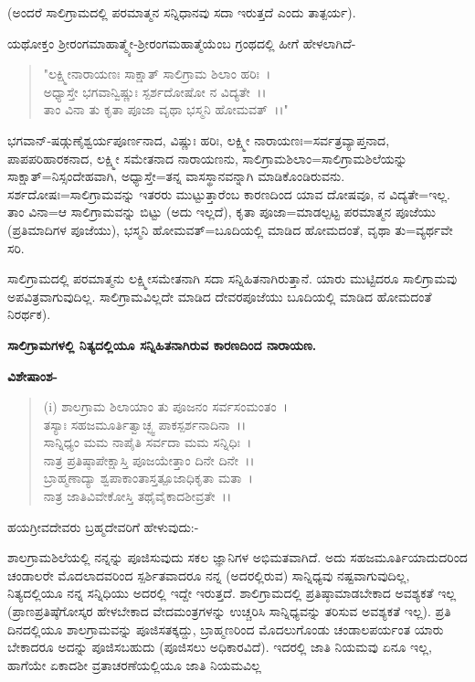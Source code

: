 (ಅಂದರೆ ಸಾಲಿಗ್ರಾಮದಲ್ಲಿ ಪರಮಾತ್ಮನ ಸನ್ನಿಧಾನವು ಸದಾ ಇರುತ್ತದೆ ಎಂದು ತಾತ್ಪರ್ಯ).

ಯಥೋಕ್ತಂ ಶ‍್ರೀರಂಗಮಾಹಾತ್ಮ್ಯೇ-ಶ‍್ರೀರಂಗಮಹಾತ್ಮೆಯೆಂಬ ಗ್ರಂಥದಲ್ಲಿ ಹೀಗೆ ಹೇಳಲಾಗಿದೆ-

\begin{verse}
"ಲಕ್ಷ್ಮೀನಾರಾಯಣಃ ಸಾಕ್ಷಾತ್ ಸಾಲಿಗ್ರಾಮ ಶಿಲಾಂ ಹರಿಃ~।\\ ಅಧ್ಯಾಸ್ತೇ ಭಗವಾನ್ವಿಷ್ಣುಃ ಸ್ಪರ್ಶದೋಷೋ ನ ವಿದ್ಯತೇ~।।\\ ತಾಂ ವಿನಾ ತು ಕೃತಾ ಪೂಜಾ ವೃಥಾ ಭಸ್ಮನಿ ಹೋಮವತ್~।।"
\end{verse}


ಭಗವಾನ್-ಷಡ್ಗುಣೈಶ್ವರ್ಯಪೂರ್ಣನಾದ, ವಿಷ್ಣುಃ ಹರಿಃ, ಲಕ್ಷ್ಮೀ ನಾರಾಯಣಃ=ಸರ್ವತ್ರವ್ಯಾಪ್ತನಾದ, ಪಾಪಪರಿಹಾರಕನಾದ, ಲಕ್ಷ್ಮೀ ಸಮೇತನಾದ ನಾರಾಯಣನು, ಸಾಲಿಗ್ರಾಮಶಿಲಾಂ=ಸಾಲಿಗ್ರಾಮಶಿಲೆಯನ್ನು ಸಾಕ್ಷಾತ್=ನಿಸ್ಸಂದೇಹವಾಗಿ, ಅಧ್ಯಾಸ್ತೇ=ತನ್ನ ವಾಸಸ್ಥಾನವನ್ನಾಗಿ ಮಾಡಿಕೊಂಡಿರುವನು. ಸರ್ಶದೋಷಃ=ಸಾಲಿಗ್ರಾಮವನ್ನು ಇತರರು ಮುಟ್ಟುತ್ತಾರೆಂಬ ಕಾರಣದಿಂದ ಯಾವ ದೋಷವೂ, ನ ವಿದ್ಯತೇ=ಇಲ್ಲ. ತಾಂ ವಿನಾ=ಆ ಸಾಲಿಗ್ರಾಮವನ್ನು ಬಿಟ್ಟು (ಅದು ಇಲ್ಲದೆ), ಕೃತಾ ಪೂಜಾ=ಮಾಡಲ್ಪಟ್ಟ ಪರಮಾತ್ಮನ ಪೂಜೆಯು (ಪ್ರತಿಮಾದಿಗಳ ಪೂಜೆಯು), ಭಸ್ಮನಿ ಹೋಮವತ್=ಬೂದಿಯಲ್ಲಿ ಮಾಡಿದ ಹೋಮದಂತೆ, ವೃಥಾ ತು=ವ್ಯರ್ಥವೇ ಸರಿ.

ಸಾಲಿಗ್ರಾಮದಲ್ಲಿ ಪರಮಾತ್ಮನು ಲಕ್ಷ್ಮೀಸಮೇತನಾಗಿ ಸದಾ ಸನ್ನಿಹಿತನಾಗಿರುತ್ತಾನೆ. ಯಾರು ಮುಟ್ಟಿದರೂ ಸಾಲಿಗ್ರಾಮವು ಅಪವಿತ್ರವಾಗುವುದಿಲ್ಲ. ಸಾಲಿಗ್ರಾಮವಿಲ್ಲದೇ ಮಾಡಿದ ದೇವರಪೂಜೆಯು ಬೂದಿಯಲ್ಲಿ ಮಾಡಿದ ಹೋಮದಂತೆ ನಿರರ್ಥಕ).

\begin{center}
\textbf{ಸಾಲಿಗ್ರಾಮಗಳಲ್ಲಿ ನಿತ್ಯದಲ್ಲಿಯೂ ಸನ್ನಿಹಿತನಾಗಿರುವ ಕಾರಣದಿಂದ ನಾರಾಯಣ.}
\end{center}

\noindent
\textbf{ವಿಶೇಷಾಂಶ-}

\begin{verse}
(i) ಶಾಲಗ್ರಾಮ ಶಿಲಾಯಾಂ ತು ಪೂಜನಂ ಸರ್ವಸಂಮಂತಂ~।\\ ತಸ್ಯಾಃ ಸಹಜಮೂರ್ತಿತ್ವಾಚ್ಛ್ವ ಪಾಕಸ್ಪರ್ಶನಾದಿನಾ~।।\\ ಸಾನ್ನಿಧ್ಯಂ ಮಮ ನಾಪೈತಿ ಸರ್ವದಾ ಮಮ ಸನ್ನಿಧಿಃ~।\\ ನಾತ್ರ ಪ್ರತಿಷ್ಠಾಪೇಕ್ಷಾಸ್ತಿ ಪೂಜಯೇತ್ತಾಂ ದಿನೇ ದಿನೇ~।।\\ ಬ್ರಾಹ್ಮಣಾದ್ಯಾ ಶ್ವಪಾಕಾಂತಾಸ್ತತ್ಪೂಜಾಧಿಕೃತಾ ಮತಾ~।\\ ನಾತ್ರ ಜಾತಿವಿವೇಕೋಸ್ತಿ ತಥೈವೈಕಾದಶೀವ್ರತೇ~।।
\end{verse}


\noindent
ಹಯಗ್ರೀವದೇವರು ಬ್ರಹ್ಮದೇವರಿಗೆ ಹೇಳುವುದು:-

ಶಾಲಗ್ರಾಮಶಿಲೆಯಲ್ಲಿ ನನ್ನನ್ನು ಪೂಜಿಸುವುದು ಸಕಲ ಜ್ಞಾನಿಗಳ ಅಭಿಮತವಾಗಿದೆ. ಅದು ಸಹಜಮೂರ್ತಿಯಾದುದರಿಂದ ಚಂಡಾಲರೇ ಮೊದಲಾದವರಿಂದ ಸ್ಪರ್ಶಿತವಾದರೂ ನನ್ನ (ಅದರಲ್ಲಿರುವ) ಸಾನ್ನಿಧ್ಯವು ನಷ್ಟವಾಗುವುದಿಲ್ಲ, ನಿತ್ಯದಲ್ಲಿಯೂ ನನ್ನ ಸನ್ನಿಧಿಯು ಅದರಲ್ಲಿ ಇದ್ದೇ ಇರುತ್ತದೆ. ಶಾಲಿಗ್ರಾಮದಲ್ಲಿ ಪ್ರತಿಷ್ಠಾಮಾಡಬೇಕಾದ ಅವಶ್ಯಕತೆ ಇಲ್ಲ (ಪ್ರಾಣಪ್ರತಿಷ್ಠೆಗೋಸ್ಕರ ಹೇಳಬೇಕಾದ ವೇದಮಂತ್ರಗಳನ್ನು ಉಚ್ಚರಿಸಿ ಸಾನ್ನಿಧ್ಯವನ್ನು ತರಿಸುವ ಅವಶ್ಯಕತೆ ಇಲ್ಲ). ಪ್ರತಿ ದಿನದಲ್ಲಿಯೂ ಶಾಲಗ್ರಾಮವನ್ನು ಪೂಜಿಸತಕ್ಕದ್ದು, ಬ್ರಾಹ್ಮಣರಿಂದ ಮೊದಲುಗೊಂಡು ಚಂಡಾಲಪರ್ಯಂತ ಯಾರು ಬೇಕಾದರೂ ಅದನ್ನು ಪೂಜಿಸಬಹುದು (ಪೂಜಿಸಲು ಅಧಿಕಾರವಿದೆ). ಇದರಲ್ಲಿ ಜಾತಿ ನಿಯಮವು ಏನೂ ಇಲ್ಲ, ಹಾಗೆಯೇ ಏಕಾದಶೀ ವ್ರತಾಚರಣೆಯಲ್ಲಿಯೂ ಜಾತಿ ನಿಯಮವಿಲ್ಲ

